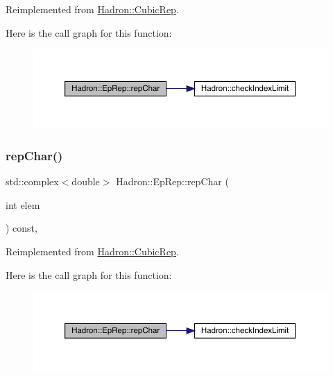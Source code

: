 Reimplemented from \mbox{\hyperlink{structHadron_1_1CubicRep_af45227106e8e715e84b0af69cd3b36f8}{Hadron\+::\+Cubic\+Rep}}.

Here is the call graph for this function\+:
\nopagebreak
\begin{figure}[H]
\begin{center}
\leavevmode
\includegraphics[width=350pt]{d7/da2/structHadron_1_1EpRep_a87fd401f4263b709af08948c9452a717_cgraph}
\end{center}
\end{figure}
\mbox{\label{structHadron_1_1EpRep_a87fd401f4263b709af08948c9452a717}} 
\subsubsection{\texorpdfstring{repChar()}{repChar()}\hspace{0.1cm}{\footnotesize\ttfamily [3/3]}}
{\footnotesize\ttfamily std\+::complex$<$double$>$ Hadron\+::\+Ep\+Rep\+::rep\+Char (\begin{DoxyParamCaption}\item[{int}]{elem }\end{DoxyParamCaption}) const\hspace{0.3cm}{\ttfamily [inline]}, {\ttfamily [virtual]}}



Reimplemented from \mbox{\hyperlink{structHadron_1_1CubicRep_af45227106e8e715e84b0af69cd3b36f8}{Hadron\+::\+Cubic\+Rep}}.

Here is the call graph for this function\+:
\nopagebreak
\begin{figure}[H]
\begin{center}
\leavevmode
\includegraphics[width=350pt]{d7/da2/structHadron_1_1EpRep_a87fd401f4263b709af08948c9452a717_cgraph}
\end{center}
\end{figure}
\mbox{\label{structHadron_1_1EpRep_a51731663ac1ad2e9e41f7527b536e2b5}} 
